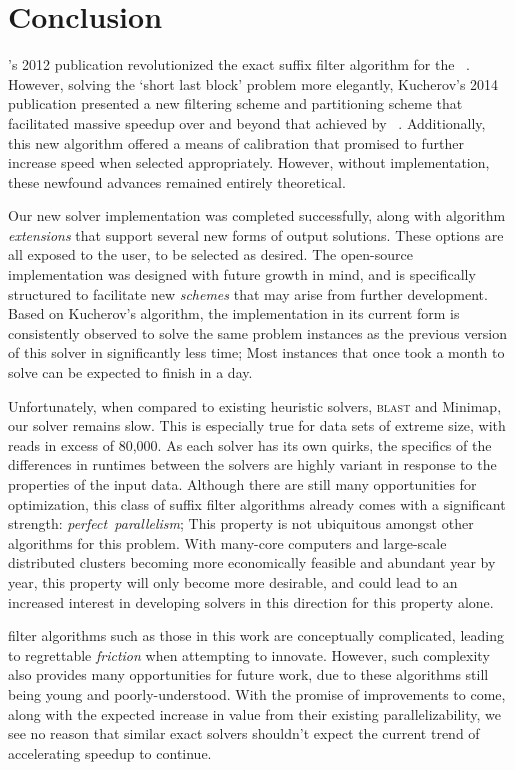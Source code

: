 \chapter{Conclusion}

\vali{}'s 2012 publication revolutionized the exact \gls{suffix filter} algorithm for the \aspop{}~\cite{vali2012}. However, solving the `short last block' problem more elegantly, Kucherov's 2014 publication presented a new \gls{filtering scheme} and \gls{partitioning scheme} that facilitated massive speedup over and beyond that achieved by \vali{}~\cite{kuch2014}. Additionally, this new algorithm offered a means of calibration that promised to further increase speed when selected appropriately. However, without implementation, these newfound advances remained entirely theoretical.


Our new \aspop{} solver implementation was completed successfully, along with algorithm \textit{extensions} that support several new forms of output \glspl{solution}. These options are all exposed to the user, to be selected as desired. The open-source implementation was designed with future growth in mind, and is specifically structured to facilitate new \textit{schemes} that may arise from further development. Based on Kucherov's algorithm, the implementation in its current form is consistently observed to solve the same problem instances as the previous version of this solver in significantly less time; Most instances that once took a month to solve can be expected to finish in a day.

Unfortunately, when compared to existing heuristic \aspop{} solvers, \textsc{blast} and Minimap, our solver remains slow. This is especially true for data sets of extreme size, with \glspl{read} in excess of 80,000. As each solver has its own quirks, the specifics of the differences in runtimes between the solvers are highly variant in response to the properties of the input data. Although there are still many opportunities for optimization, this class of suffix filter algorithms already comes with a significant strength: \mbox{\textit{perfect~parallelism}}; This property is not ubiquitous amongst other algorithms for this problem. With many-core computers and large-scale distributed clusters becoming more economically feasible and abundant year by year, this property will only become more desirable, and could lead to an increased interest in developing solvers in this direction for this property alone.

\Glspl{filter algorithm} such as those in this work are conceptually complicated, leading to regrettable \textit{friction} when attempting to innovate. However, such complexity also provides many opportunities for future work, due to these algorithms still being young and poorly-understood. With the promise of improvements to come, along with the expected increase in value from their existing parallelizability, we see no reason that similar exact solvers shouldn't expect the current trend of accelerating speedup to continue.

